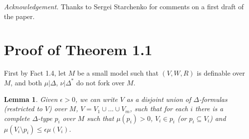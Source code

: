 \documentclass[12pt]{article}
\newtheorem{Lemma}[Theorem]{Lemma}
\begin{document}
\vspace{5mm}
\noindent
{\em Acknowledgement.} Thanks to Sergei Starchenko for comments on a first draft of the paper.

\section{Proof of Theorem 1.1}
First by Fact 1.4, let $M$ be a small model such that $(V,W,R)$ is definable over $M$, and both $\mu|\Delta$, $\nu|\Delta^{*}$ do not fork over $M$. 

\begin{Lemma}  Given $\epsilon > 0$, we can write $V$ as a disjoint union of $\Delta$-formulas (restricted to $V$) over $M$,  $V = V_{1}\cup ... \cup V_{m}$, such that for each $i$ there is a complete $\Delta$-type $p_{i}$ over $M$ such that $\mu(p_{i}) > 0$, $V_{i}\in p_{i}$ (or $p_{i}\subseteq V_{i}$)  and $\mu(V_{i}\setminus p_{i}) \leq \epsilon\mu(V_{i})$.

\end{Lemma}
\end{document}

